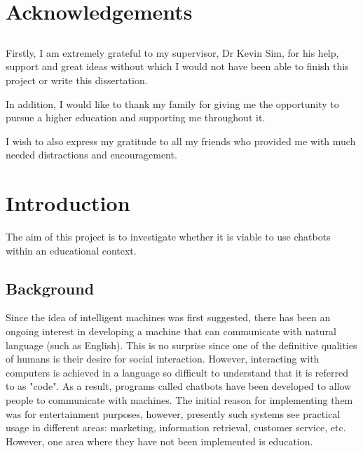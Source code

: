 \documentclass[12pt,a4paper]{article}
\makeatletter
\newcommand\mainmatter{%
    \cleardoublepage
  \pagenumbering{arabic}}
\makeatother
\begin{document}
\lstlistoflistings
\listoftodos[Notes]
\newpage

\section*{Acknowledgements}
\subsection*{}
    Firstly, I am extremely grateful to my supervisor, Dr Kevin Sim, for his help, support and great ideas without which I would not have been able to finish this project or write this dissertation. 

    In addition, I would like to thank my family for giving me the opportunity to pursue a higher education and supporting me throughout it.

    I wish to also express my gratitude to all my friends who provided me with much needed distractions and encouragement. 
    
\newpage

% 

 \mainmatter

\section{Introduction}
The aim of this project is to investigate whether it is viable to use chatbots within an educational context.

\subsection{Background}
Since the idea of intelligent machines was first suggested, there has been an ongoing interest in developing a machine that can communicate with natural language (such as English). This is no surprise since one of the definitive qualities of humans is their desire for social interaction. However, interacting with computers is achieved in a language so difficult to understand that it is referred to as "code". As a result, programs called chatbots have been developed to allow people to communicate with machines. The initial reason for implementing them was for entertainment purposes, however, presently such systems see practical usage in different areas: marketing, information retrieval, customer service, etc. However, one area where they have not been implemented is education. 
\end{document}
